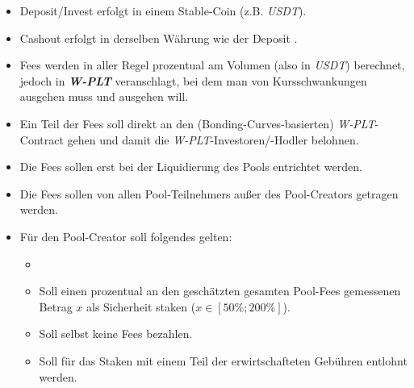 \begin{Praemisse}

\begin{itemize}
	\item Deposit/Invest erfolgt in einem Stable-Coin (z.B. \textit{USDT}). 
	\item Cashout erfolgt in derselben Währung wie der Deposit . 
	\item Fees werden in aller Regel prozentual am Volumen (also in \textit{USDT}) berechnet, jedoch in \textbf{\textit{W-PLT}} veranschlagt, bei dem man von Kursschwankungen ausgehen muss und ausgehen will. 
	\item Ein Teil der Fees soll direkt an den (Bonding-Curves-basierten) \textit{W-PLT}-Contract gehen und damit die \textit{W-PLT}-Investoren/-Hodler belohnen.
	\item Die Fees sollen  erst bei der Liquidierung des Pools entrichtet werden.
	\item Die Fees sollen von allen Pool-Teilnehmers außer des Pool-Creators getragen werden.
	\item Für den Pool-Creator soll folgendes gelten:
	\begin{itemize}
		\item {}
		\item Soll einen prozentual an den geschätzten gesamten Pool-Fees gemessenen Betrag $x$ als Sicherheit staken ($x \in [50 \%; 200 \%]$). 
		\item Soll selbst keine Fees bezahlen.
		\item Soll für das Staken mit einem Teil der erwirtschafteten Gebühren entlohnt werden.
	\end{itemize}
\end{itemize}

\end{Praemisse}

\vspace{0.5cm}

